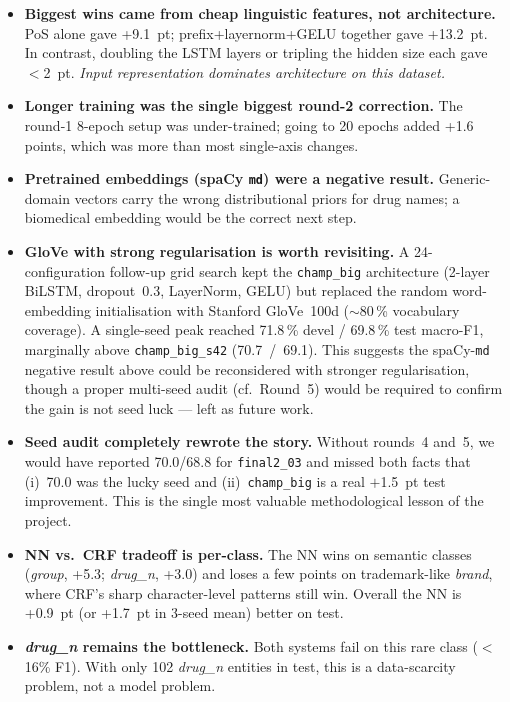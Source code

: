 \documentclass[a4paper,12pt]{article}
\begin{document}
\begin{itemize}[nosep]
    \item \textbf{Biggest wins came from cheap linguistic features,
    not architecture.} PoS alone gave +9.1~pt; prefix+layernorm+GELU
    together gave +13.2~pt. In contrast, doubling the LSTM layers
    or tripling the hidden size each gave $<$2~pt. \emph{Input
    representation dominates architecture on this dataset.}
    \item \textbf{Longer training was the single biggest round-2
    correction.} The round-1 8-epoch setup was under-trained; going
    to 20 epochs added +1.6 points, which was more than most
    single-axis changes.
    \item \textbf{Pretrained embeddings (spaCy \texttt{md}) were a
    negative result.} Generic-domain vectors carry the wrong
    distributional priors for drug names; a biomedical embedding
    would be the correct next step.
    \item \textbf{GloVe with strong regularisation is worth
    revisiting.} A 24-configuration follow-up grid search kept the
    \texttt{champ\_big} architecture (2-layer BiLSTM, dropout~0.3,
    LayerNorm, GELU) but replaced the random word-embedding
    initialisation with Stanford GloVe~100d ($\sim$80\,\% vocabulary
    coverage). A single-seed peak reached 71.8\,\% devel / 69.8\,\%
    test macro-F1, marginally above \texttt{champ\_big\_s42}
    (70.7~/~69.1). This suggests the spaCy-\texttt{md} negative
    result above could be reconsidered with stronger regularisation,
    though a proper multi-seed audit (cf.\ Round~5) would be required
    to confirm the gain is not seed luck --- left as future work.
    \item \textbf{Seed audit completely rewrote the story.} Without
    rounds~4 and~5, we would have reported 70.0/68.8 for
    \texttt{final2\_03} and missed both facts that (i)~70.0 was the
    lucky seed and (ii)~\texttt{champ\_big} is a real $+$1.5~pt test
    improvement. This is the single most valuable methodological
    lesson of the project.
    \item \textbf{NN vs.\ CRF tradeoff is per-class.} The NN wins on
    semantic classes (\textit{group}, +5.3; \textit{drug\_n}, +3.0)
    and loses a few points on trademark-like \textit{brand}, where
    CRF's sharp character-level patterns still win. Overall the NN
    is +0.9~pt (or +1.7~pt in 3-seed mean) better on test.
    \item \textbf{\textit{drug\_n} remains the bottleneck.}
    Both systems fail on this rare class ($<$16\% F1). With only 102
    \textit{drug\_n} entities in test, this is a data-scarcity
    problem, not a model problem.
\end{itemize}
\end{document}
